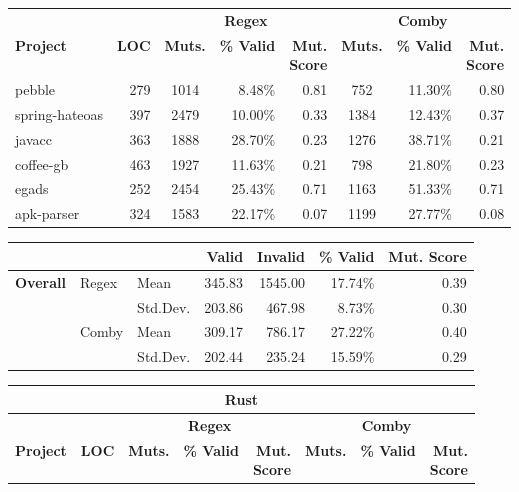 \documentclass[acmsmall]{acmart}
\newcommand{\mr}[2]{\multirow{#1}{*}{#2}}
\newcommand{\mc}[3]{\multicolumn{#1}{#2}{#3}}
\begin{document}
{\begin{table}[hbtp]
\begin{varwidth}{.8\linewidth}
\begin{tabularx}{\linewidth}{X|r|crr|crr}
                 &              & \multicolumn{3}{c|}{\textbf{Regex}} &\multicolumn{3}{c}{\textbf{Comby}}  \\
\textbf{Project} & \textbf{LOC} & \textbf{Muts.} & \textbf{\% Valid} & \makecell{\textbf{Mut.} \\ \textbf{Score}} &  \textbf{Muts.} &  \textbf{\% Valid} & \makecell{\textbf{Mut.} \\ \textbf{Score}} \\\midrule
 pebble         & 279 & 1014 & 8.48\% & 0.81 & 752 & 11.30\%  & 0.80 \\
 spring-hateoas & 397 & 2479 & 10.00\% & 0.33 & 1384 & 12.43\% & 0.37 \\
 javacc         & 363 & 1888 & 28.70\% & 0.23 & 1276 & 38.71\% & 0.21 \\
 coffee-gb      & 463 & 1927 & 11.63\% & 0.21 & 798 & 21.80\% & 0.23\\
 egads          & 252 & 2454 & 25.43\% & 0.71 & 1163 & 51.33\% & 0.71\\
 apk-parser     & 324 & 1583 & 22.17\% & 0.07 & 1199 & 27.77\% & 0.08 \\\bottomrule
\end{tabularx}
\begin{tabularx}{\linewidth}{Xllrrrr}
              & & & \textbf{Valid}  & \textbf{Invalid}  & \textbf{\% Valid} & \textbf{Mut. Score} \\\midrule
\multirow{4}{*}{\textbf{Overall}} & \mr{2}{Regex} & Mean     &  345.83 & 1545.00  & 17.74\% & 0.39\\
              &   & Std.Dev. & 203.86 & 467.98 & 8.73\%  & 0.30\\\cline{2-7}
& \mr{2}{Comby} & Mean     & 309.17 & 786.17 & 27.22\% & 0.40\\
              &   & Std.Dev. & 202.44 & 235.24  & 15.59\% & 0.29 \\\bottomrule
\end{tabularx}
\begin{tabularx}{\linewidth}{X|r|crr|crr}
\toprule
\mc{8}{c}{\textbf{Rust}} \\ \midrule
                 &              & \multicolumn{3}{c|}{\textbf{Regex}} &\multicolumn{3}{c}{\textbf{Comby}}  \\
\textbf{Project} & \textbf{LOC} & \textbf{Muts.} & \textbf{\% Valid} & \makecell{\textbf{Mut.} \\ \textbf{Score}} & \textbf{Muts.} &  \textbf{\% Valid} & \makecell{\textbf{Mut.} \\ \textbf{Score}}\\\midrule

\end{tabularx}
\end{varwidth}
\end{table}}
\end{document}
